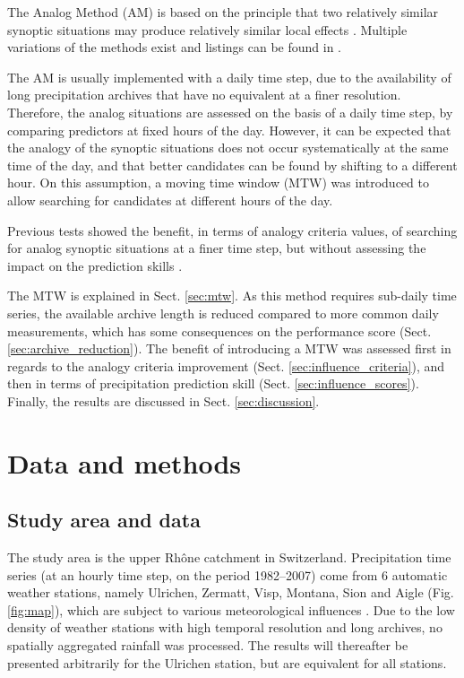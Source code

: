 \documentclass[hess, manuscript]{copernicus}
\begin{document}
\introduction  %
\label{sec:introduction}

The Analog Method (AM) is based on the principle that two relatively similar synoptic situations may produce relatively similar local effects \citep{Lorenz1956, Lorenz1969}. Multiple variations of the methods exist and listings can be found in \citet{BenDaoud2016}.

The AM is usually implemented with a daily time step, due to the availability of long precipitation archives that have no equivalent at a finer resolution. Therefore, the analog situations are assessed on the basis of a daily time step, by comparing predictors at fixed hours of the day. However, it can be expected that the analogy of the synoptic situations does not occur systematically at the same time of the day, and that better candidates can be found by shifting to a different hour. On this assumption, a moving time window (MTW) was introduced to allow searching for candidates at different hours of the day.

Previous tests showed the benefit, in terms of analogy criteria values, of searching for analog synoptic situations at a finer time step, but without assessing the impact on the prediction skills \citep{Finet2008}. 


The MTW is explained in Sect. \ref{sec:mtw}. As this method requires sub-daily time series, the available archive length is reduced compared to more common daily measurements, which has some consequences on the performance score (Sect. \ref{sec:archive_reduction}). The benefit of introducing a MTW was assessed first in regards to the analogy criteria improvement (Sect. \ref{sec:influence_criteria}), and then in terms of precipitation prediction skill (Sect. \ref{sec:influence_scores}). Finally, the results are discussed in Sect. \ref{sec:discussion}.



\section{Data and methods}

\subsection{Study area and data}
\label{sec:data}

The study area is the upper Rh\^{o}ne catchment in Switzerland. Precipitation time series (at an hourly time step, on the period 1982--2007) come from 6 automatic weather stations, namely Ulrichen, Zermatt, Visp, Montana, Sion and Aigle (Fig. \ref{fig:map}), which are subject to various meteorological influences \citep{Horton2012}. Due to the low density of weather stations with high temporal resolution and long archives, no spatially aggregated rainfall was processed. The results will thereafter be presented arbitrarily for the Ulrichen station, but are equivalent for all stations.
\end{document}

